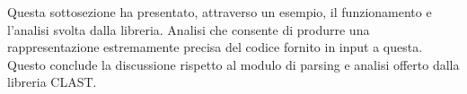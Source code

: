 Questa sottosezione ha presentato, attraverso un esempio, il funzionamento e
l’analisi svolta dalla libreria. Analisi che consente di produrre una
rappresentazione estremamente precisa del codice fornito in input a questa.
Questo conclude la discussione rispetto al modulo di parsing e analisi offerto
dalla libreria CLAST.

